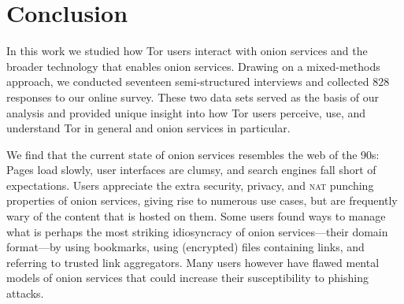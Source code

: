 \section{Conclusion}
\label{sec:conclusion}

In this work we studied how Tor users interact with onion services and the
broader technology that enables onion services.  Drawing on a mixed-methods
approach, we conducted seventeen semi-structured interviews and collected 828
responses to our online survey.  These two data sets served as the basis of our
analysis and provided unique insight into how Tor users perceive, use, and
understand Tor in general and onion services in particular.

We find that the current state of onion services resembles the web of the 90s:
Pages load slowly, user interfaces are clumsy, and search engines fall short of
expectations.  Users appreciate the extra security, privacy, and \textsc{nat}
punching properties of onion services, giving rise to numerous use cases, but
are frequently wary of the content that is hosted on them.  Some users found
ways to manage what is perhaps the most striking idiosyncracy of onion
services---their domain format---by using bookmarks, using (encrypted) files
containing links, and referring to trusted link aggregators.  Many users however
have flawed mental models of onion services that could increase their
susceptibility to phishing attacks.
